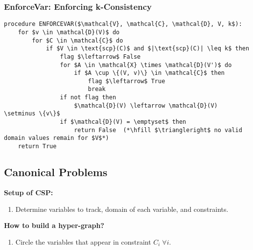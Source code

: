 \subsubsection{EnforceVar: Enforcing k-Consistency}
\begin{algo}
\begin{lstlisting}
procedure ENFORCEVAR($\mathcal{V}, \mathcal{C}, \mathcal{D}, V, k$):
    for $v \in \mathcal{D}(V)$ do
        for $C \in \mathcal{C}$ do
            if $V \in \text{scp}(C)$ and $|\text{scp}(C)| \leq k$ then
                flag $\leftarrow$ False
                for $A \in \mathcal{X} \times \mathcal{D}(V')$ do
                    if $A \cup \{(V, v)\} \in \mathcal{C}$ then
                        flag $\leftarrow$ True
                        break
                if not flag then
                    $\mathcal{D}(V) \leftarrow \mathcal{D}(V) \setminus \{v\}$
                if $\mathcal{D}(V) = \emptyset$ then
                    return False  (*\hfill $\triangleright$ no valid domain values remain for $V$*)
    return True
\end{lstlisting}
\end{algo}
\newpage

\subsection{Canonical Problems}
\begin{process} \textbf{Setup of CSP:}
    \begin{enumerate}
        \item Determine variables to track, domain of each variable, and constraints.
    \end{enumerate}
\end{process}
\begin{example}
\end{example}
\newpage

\begin{process} \textbf{How to build a hyper-graph?}
    \begin{enumerate}
        \item Circle the variables that appear in constraint $C_i \; \forall i$.
    \end{enumerate}
\end{process}

\begin{example}
\end{example}

